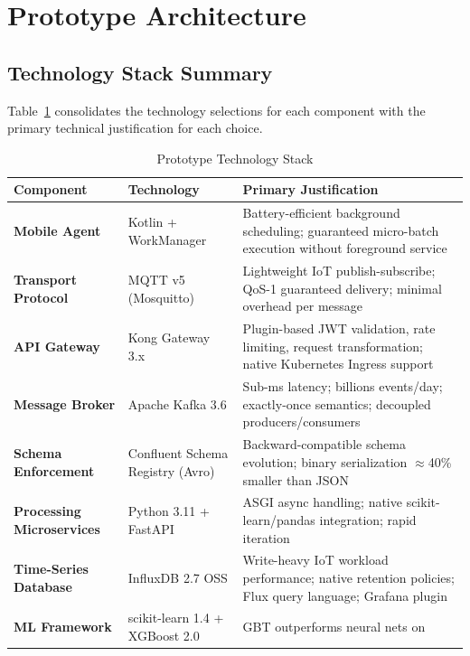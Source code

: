 \documentclass[conference]{IEEEtran}
\begin{document}
\section{Prototype Architecture}

\subsection{Technology Stack Summary}

Table~\ref{tab:stack} consolidates the technology selections for each component with the
primary technical justification for each choice.

\begin{table}[H]
  \centering
  \caption{Prototype Technology Stack}
  \label{tab:stack}
  \begin{tabularx}{\textwidth}{>{\bfseries}p{3.5cm} p{3.5cm} X}
    \toprule
    \textbf{Component} & \textbf{Technology} & \textbf{Primary Justification} \\
    \midrule
    Mobile Agent & Kotlin + WorkManager & Battery-efficient background scheduling;
      guaranteed micro-batch execution without foreground service \\
    Transport Protocol & MQTT v5 (Mosquitto) & Lightweight IoT publish-subscribe;
      QoS-1 guaranteed delivery; minimal overhead per message \cite{b8} \\
    API Gateway & Kong Gateway 3.x & Plugin-based JWT validation, rate limiting, request
      transformation; native Kubernetes Ingress support \cite{b9} \\
    Message Broker & Apache Kafka 3.6 & Sub-ms latency; billions events/day;
      exactly-once semantics; decoupled producers/consumers \cite{b10} \\
    Schema Enforcement & Confluent Schema Registry (Avro) & Backward-compatible
      schema evolution; binary serialization $\approx$40\% smaller than JSON \\
    Processing Microservices & Python 3.11 + FastAPI & ASGI async handling;
      native scikit-learn/pandas integration; rapid iteration \\
    Time-Series Database & InfluxDB 2.7 OSS & Write-heavy IoT workload performance;
      native retention policies; Flux query language; Grafana plugin \cite{b7} \\
    ML Framework & scikit-learn 1.4 + XGBoost 2.0 & GBT outperforms neural nets on

\end{tabularx}
\end{table}
\end{document}

